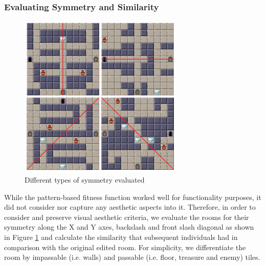 
\subsubsection{Evaluating Symmetry and Similarity}

\begin{figure}
\centering
\includegraphics[width=0.7\textwidth]{included-papers-tex/paper-2/pap2-figures/DifferentSymmetry.png}
\caption{Different types of symmetry evaluated}
\label{p2fig:symmetry-types}
\end{figure}

While the pattern-based fitness function worked well for functionality purposes, it did not consider nor capture any aesthetic aspects into it. Therefore, in order to consider and preserve visual aesthetic criteria, we evaluate the rooms for their symmetry  along the X and Y axes, backslash and front slash diagonal as shown in Figure \ref{p2fig:symmetry-types} and calculate the similarity that subsequent individuals had in comparison with the original edited room. For simplicity, we differentiate the room by impassable (i.e. walls) and passable (i.e. floor, treasure and enemy) tiles.

